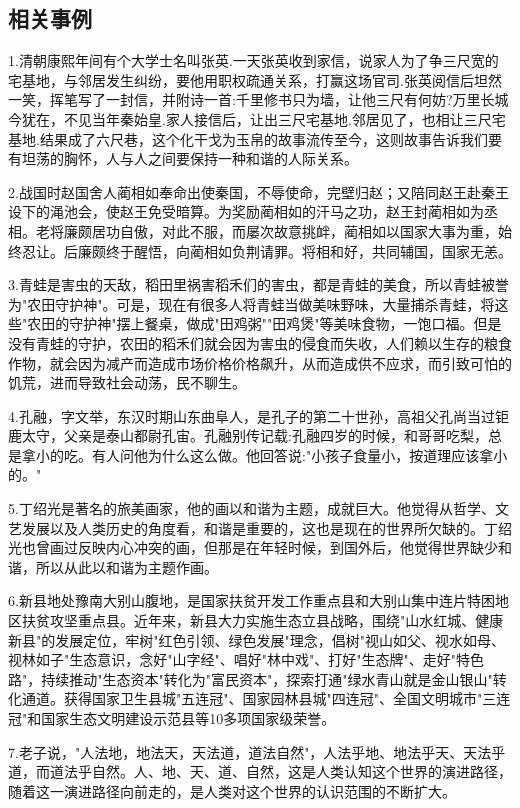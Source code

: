 \documentclass[UTF8]{ctexart}
\begin{document}
\subsection{相关事例}
1.清朝康熙年间有个大学士名叫张英.一天张英收到家信，说家人为了争三尺宽的宅基地，与邻居发生纠纷，要他用职权疏通关系，打赢这场官司.张英阅信后坦然一笑，挥笔写了一封信，并附诗一首:千里修书只为墙，让他三尺有何妨?万里长城今犹在，不见当年秦始皇.家人接信后，让出三尺宅基地.邻居见了，也相让三尺宅基地.结果成了六尺巷，这个化干戈为玉帛的故事流传至今，这则故事告诉我们要有坦荡的胸怀，人与人之间要保持一种和谐的人际关系。\par
2.战国时赵国舍人蔺相如奉命出使秦国，不辱使命，完壁归赵；又陪同赵王赴秦王设下的渑池会，使赵王免受暗算。为奖励蔺相如的汗马之功，赵王封蔺相如为丞相。老将廉颇居功自傲，对此不服，而屡次故意挑衅，蔺相如以国家大事为重，始终忍让。后廉颇终于醒悟，向蔺相如负荆请罪。将相和好，共同辅国，国家无恙。\par
3.青蛙是害虫的天敌，稻田里祸害稻禾们的害虫，都是青蛙的美食，所以青蛙被誉为"农田守护神"。可是，现在有很多人将青蛙当做美味野味，大量捕杀青蛙，将这些"农田的守护神"摆上餐桌，做成"田鸡粥""田鸡煲"等美味食物，一饱口福。但是没有青蛙的守护，农田的稻禾们就会因为害虫的侵食而失收，人们赖以生存的粮食作物，就会因为减产而造成市场价格价格飙升，从而造成供不应求，而引致可怕的饥荒，进而导致社会动荡，民不聊生。\par
4.孔融，字文举，东汉时期山东曲阜人，是孔子的第二十世孙，高祖父孔尚当过钜鹿太守，父亲是泰山都尉孔宙。孔融别传记载:孔融四岁的时候，和哥哥吃梨，总是拿小的吃。有人问他为什么这么做。他回答说:"小孩子食量小，按道理应该拿小的。"\par
5.丁绍光是著名的旅美画家，他的画以和谐为主题，成就巨大。他觉得从哲学、文艺发展以及人类历史的角度看，和谐是重要的，这也是现在的世界所欠缺的。丁绍光也曾画过反映内心冲突的画，但那是在年轻时候，到国外后，他觉得世界缺少和谐，所以从此以和谐为主题作画。\par
6.新县地处豫南大别山腹地，是国家扶贫开发工作重点县和大别山集中连片特困地区扶贫攻坚重点县。近年来，新县大力实施生态立县战略，围绕"山水红城、健康新县"的发展定位，牢树"红色引领、绿色发展"理念，倡树"视山如父、视水如母、视林如子"生态意识，念好"山字经"、唱好"林中戏"、打好"生态牌"、走好"特色路"，持续推动"生态资本"转化为"富民资本"，探索打通"绿水青山就是金山银山"转化通道。获得国家卫生县城"五连冠"、国家园林县城"四连冠"、全国文明城市"三连冠"和国家生态文明建设示范县等10多项国家级荣誉。\par
7.老子说，"人法地，地法天，天法道，道法自然"，人法乎地、地法乎天、天法乎道，而道法乎自然。人、地、天、道、自然，这是人类认知这个世界的演进路径，随着这一演进路径向前走的，是人类对这个世界的认识范围的不断扩大。\par
\newpage
\end{document}
